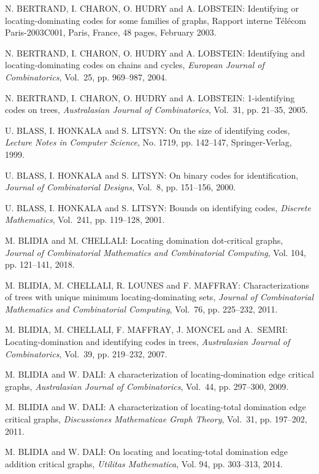 \begin{thebibliography}{999}
N. BERTRAND, I. CHARON, O. HUDRY and A. LOBSTEIN: Identifying or locating-dominating codes for some families of graphs, Rapport interne T\'el\'ecom Paris-2003C001, Paris, France, 48 pages, February 2003.

N. BERTRAND, I. CHARON, O. HUDRY and A. LOBSTEIN: Identifying and locating-dominating codes on chains and cycles, {\it European Journal of Combinatorics}, Vol.~25, pp. 969--987, 2004.

N. BERTRAND, I. CHARON, O. HUDRY and A. LOBSTEIN: 1-identifying codes on trees, {\it Australasian Journal of Combinatorics}, Vol.~31, pp. 21--35, 2005.

U. BLASS, I. HONKALA and S. LITSYN: On the size of identifying codes, {\it Lecture Notes in Computer Science}, No. 1719, pp. 142--147, Springer-Verlag, 1999.

U. BLASS, I. HONKALA and S. LITSYN: On binary codes for identification, {\it Journal of Combinatorial Designs}, Vol.~8, pp. 151--156, 2000.

U. BLASS, I. HONKALA and S. LITSYN: Bounds on identifying codes, {\it Discrete Mathematics}, Vol.~241, pp. 119--128, 2001.

M. BLIDIA and M. CHELLALI: Locating domination dot-critical graphs, {\it Journal of Combinatorial Mathematics and Combinatorial Computing}, Vol. 104, pp. 121--141, 2018.

M. BLIDIA, M. CHELLALI, R. LOUNES and F. MAFFRAY: Characterizations of trees with unique minimum locating-dominating sets, {\it Journal of Combinatorial Mathematics and Combinatorial Computing}, Vol.~76, pp. 225--232, 2011.

M. BLIDIA, M. CHELLALI, F. MAFFRAY, J. MONCEL and A.~SEMRI: Locating-domination and identifying codes in trees, {\it Australasian Journal of Combinatorics}, Vol.~39, pp. 219--232, 2007.

M. BLIDIA and W. DALI: A characterization of locating-domination edge critical graphs, {\it Australasian Journal of Combinatorics}, Vol.~44, pp. 297--300, 2009.

M. BLIDIA and W. DALI: A characterization of locating-total domination edge critical graphs, {\it Discussiones Mathematicae Graph Theory}, Vol.~31, pp. 197--202, 2011.

M. BLIDIA and W. DALI:
On locating and locating-total domination edge addition critical graphs,
{\it Utilitas Mathematica}, Vol. 94, pp. 303--313, 2014.


\end{thebibliography}
